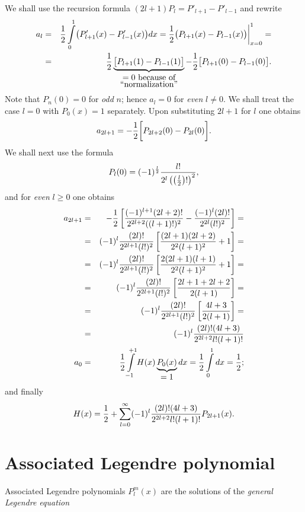 {We shall use the recursion formula $(2l+1)P_l=P'_{l+1}-P'_{l-1}$ and rewrite
\begin{eqnarray*}
 a_l &=& {1\over 2}\int\limits_0^1\bigl(P'_{l+1}(x)-
              P'_{l-1}(x)\bigr)dx=
              {1\over 2}\bigl(P_{l+1}(x)-P_{l-1}(x)\bigr)
              \biggr|_{x=0}^1=\\
            &=& {1\over 2}\underbrace{\bigl[P_{l+1}(1)-P_{l-1}(1)\bigr]}
                _{\mbox{$=0$ because of}\atop \mbox{``normalization''}}-
                {1\over 2}\bigl[P_{l+1}(0)-P_{l-1}(0)\bigr]
.
\end{eqnarray*}
Note that $P_n(0)=0$ for {\em odd} $n$; hence $  a_l=0$ for
{\em even} $l\ne0$. We shall treat the case $l=0$ with $P_0(x)=1$ separately.
Upon substituting $2l+1$ for $l$ one obtains
$$
   a_{2l+1}=-{1\over 2}\biggl[P_{2l+2}(0)-P_{2l}(0)\biggr].
$$
We shall next use the formula
$$
   P_l(0)=(-1)^{l\over 2}{l!\over
2^l\left(\left({l\over2}\right)!\right)^2},
$$
and for {\em even} $l\geq 0$ one obtains
\begin{eqnarray*}
   a_{2l+1}&=&-{1\over 2}\left[{(-1)^{l+1}(2l+2)!\over 2^{2l+2}((l+1)!)^2}
              -{(-1)^l(2l)!\over 2^{2l}(l!)^2}\right]=\\
   &=&(-1)^l{(2l)!\over 2^{2l+1}(l!)^2}\left[{(2l+1)(2l+2)\over 2^2(l+1)^2}
               +1\right]=\\
   &=&(-1)^l{(2l)!\over 2^{2l+1}(l!)^2}\left[{2(2l+1)(l+1)\over 2^2(l+1)^2}
               +1\right]=\\
   &=&(-1)^l{(2l)!\over 2^{2l+1}(l!)^2}\left[{2l+1+2l+2\over 2(l+1)}\right]=\\
   &=&(-1)^l{(2l)!\over 2^{2l+1}(l!)^2}\left[{4l+3\over2(l+1)}\right]=\\
   &=&(-1)^l{(2l)!(4l+3)\over 2^{2l+2}l!(l+1)!}\\
   a_0&=&{1\over 2}\int\limits_{-1}^{+1} H (x)\underbrace{P_0(x)}_
               {\mbox{$=1$}}dx={1\over 2}\int\limits_0^1dx={1\over 2};
\end{eqnarray*}
and finally
$$
  H (x)={1\over 2}+\sum_{l=0}^\infty
   (-1)^l{(2l)!(4l+3)\over2^{2l+2}l!(l+1)!}P_{2l+1}(x).
$$
\eexample
}


\section{Associated Legendre polynomial}

Associated Legendre polynomials $P_l^m(x)$ are the solutions of the
{\em general Legendre equation}

